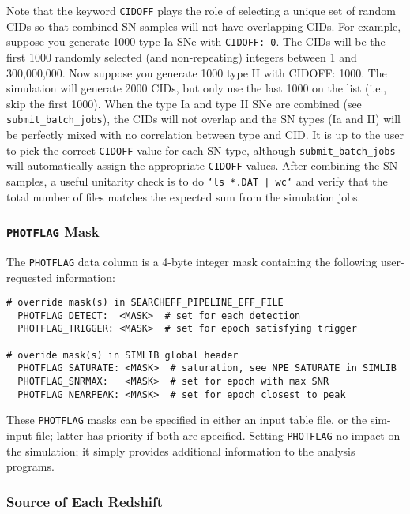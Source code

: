 \documentclass[12pt]{article}
\newcommand{\MXSIM}{300,000,000}
\begin{document}
Note that the keyword {\tt CIDOFF} plays the role of selecting
a unique set of random CIDs so that combined SN samples will 
not have overlapping CIDs. 
For example, suppose you generate 1000 type Ia SNe with {\tt CIDOFF: 0}. 
The CIDs will be the first 1000 randomly
selected (and non-repeating) integers between 1 and \MXSIM.
Now suppose you generate 1000 type II with {CIDOFF: 1000}.
The simulation will generate 2000 CIDs, but only use the last
1000 on the list (i.e., skip the first 1000).
When the type Ia and type II SNe are combined
(see {\tt submit\_batch\_jobs}), the CIDs will not overlap
and the SN types (Ia and II) will be perfectly mixed with no correlation
between type and CID. It is up to the user to pick the correct
{\tt CIDOFF} value for each SN type, although {\tt submit\_batch\_jobs}
will automatically assign the appropriate {\tt CIDOFF} values.
After combining the SN samples, a useful unitarity check is to do 
{\tt `ls *.DAT | wc`}
and verify that the total number of files matches the expected 
sum from the simulation jobs.


   \subsubsection{{\tt PHOTFLAG} Mask}
   \label{sss:PHOTFLAG}

The {\tt PHOTFLAG} data column is a 4-byte integer mask containing
the following user-requested information:
%
\begin{verbatim}
# override mask(s) in SEARCHEFF_PIPELINE_EFF_FILE
  PHOTFLAG_DETECT:  <MASK>  # set for each detection
  PHOTFLAG_TRIGGER: <MASK>  # set for epoch satisfying trigger

# overide mask(s) in SIMLIB global header
  PHOTFLAG_SATURATE: <MASK>  # saturation, see NPE_SATURATE in SIMLIB
  PHOTFLAG_SNRMAX:   <MASK>  # set for epoch with max SNR
  PHOTFLAG_NEARPEAK: <MASK>  # set for epoch closest to peak 
\end{verbatim}
%
These {\tt PHOTFLAG} masks can be specified in either an input
table file, or the sim-input file; latter has priority if both
are specified. Setting {\tt PHOTFLAG} no impact on the simulation;
it simply provides additional information to the analysis programs.


  \clearpage
   \subsubsection{Source of Each Redshift}
   \label{sss:redshift_flag}
\end{document}

